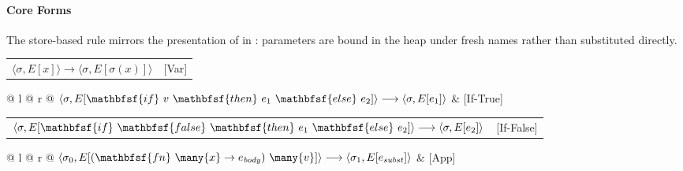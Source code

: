 \paragraph{Core Forms}
The store-based  rule mirrors the presentation of  in : parameters are bound in the heap under fresh names rather than substituted directly.

\noindent
\begin{tabular*}{\linewidth}{@{} l @{\extracolsep{\fill}} r @{}}
$\langle \sigma, E[x] \rangle \longrightarrow \langle \sigma, E[\sigma(x)] \rangle$ & [Var]
\end{tabular*}\vspace{1em}

\noindent
\begin{tabular*}{\linewidth}{@{} l @{\extracolsep{\fill}} r @{}}
$\langle \sigma, E[\mathbfsf{if}\ v\ \mathbfsf{then}\ e_1\ \mathbfsf{else}\ e_2] \rangle \longrightarrow \langle \sigma, E[e_1] \rangle$ & [If-True] \\
\end{tabular*}\vspace{1em}

\noindent
\begin{tabular*}{\linewidth}{@{} l @{\extracolsep{\fill}} r @{}}
$\langle \sigma, E[\mathbfsf{if}\ \mathbfsf{false}\ \mathbfsf{then}\ e_1\ \mathbfsf{else}\ e_2] \rangle \longrightarrow \langle \sigma, E[e_2] \rangle$ & [If-False]
\end{tabular*}\vspace{1em}

\noindent
\begin{tabular*}{\linewidth}{@{} l @{\extracolsep{\fill}} r @{}}
$\langle \sigma_0, E[(\mathbfsf{fn}\ \many{x} \to e_{\mathit{body}})\ \many{v}] \rangle \longrightarrow \langle \sigma_1, E[e_{\mathit{subst}}] \rangle$ & [App] \\
\end{tabular*}\vspace{1em}


